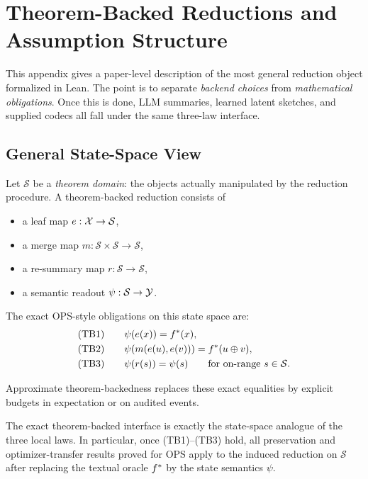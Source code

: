 \section{Theorem-Backed Reductions and Assumption Structure}
\label{app:theorem-backed}

This appendix gives a paper-level description of the most general reduction
object formalized in Lean. The point is to separate \emph{backend choices} from
\emph{mathematical obligations}. Once this is done, LLM summaries, learned
latent sketches, and supplied codecs all fall under the same three-law
interface.

\subsection{General State-Space View}

Let $\mathcal{S}$ be a \emph{theorem domain}: the objects actually manipulated
by the reduction procedure. A theorem-backed reduction consists of
\begin{itemize}[nosep]
    \item a leaf map $e:\mathcal{X}\to\mathcal{S}$,
    \item a merge map $m:\mathcal{S}\times\mathcal{S}\to\mathcal{S}$,
    \item a re-summary map $r:\mathcal{S}\to\mathcal{S}$,
    \item a semantic readout $\psi:\mathcal{S}\to\mathcal{Y}$.
\end{itemize}

The exact OPS-style obligations on this state space are:
\begin{align*}
\text{(TB1)}\qquad &\psi(e(x)) = f^{\ast}(x), \\
\text{(TB2)}\qquad &\psi(m(e(u),e(v))) = f^{\ast}(u\oplus v), \\
\text{(TB3)}\qquad &\psi(r(s)) = \psi(s)\qquad\text{for on-range }s\in\mathcal{S}.
\end{align*}

Approximate theorem-backedness replaces these exact equalities by explicit
budgets in expectation or on audited events.

\begin{proposition}
\label{prop:broadest-theorem-backed}
The exact theorem-backed interface is exactly the state-space analogue of the
three local laws. In particular, once \textup{(TB1)}--\textup{(TB3)} hold, all
preservation and optimizer-transfer results proved for OPS apply to the induced
reduction on $\mathcal{S}$ after replacing the textual oracle $f^{\ast}$ by the
state semantics $\psi$.
\end{proposition}

